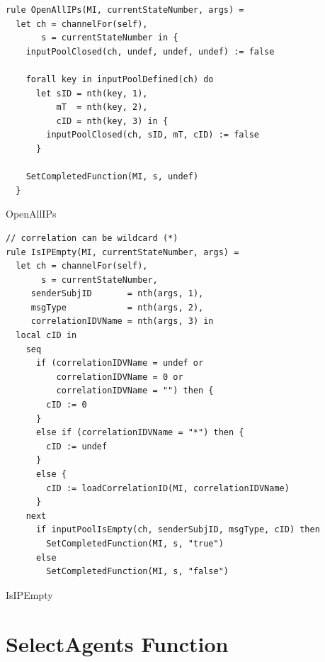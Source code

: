 \begin{listing}[H]
\begin{verbatim}
rule OpenAllIPs(MI, currentStateNumber, args) =
  let ch = channelFor(self),
       s = currentStateNumber in {
    inputPoolClosed(ch, undef, undef, undef) := false

    forall key in inputPoolDefined(ch) do
      let sID = nth(key, 1),
          mT  = nth(key, 2),
          cID = nth(key, 3) in {
        inputPoolClosed(ch, sID, mT, cID) := false
      }

    SetCompletedFunction(MI, s, undef)
  }
\end{verbatim}
\caption{OpenAllIPs}
\label{lst:asm:OpenAllIPs}
\end{listing}




\begin{listing}[H]
\begin{verbatim}
// correlation can be wildcard (*)
rule IsIPEmpty(MI, currentStateNumber, args) =
  let ch = channelFor(self),
       s = currentStateNumber,
     senderSubjID       = nth(args, 1),
     msgType            = nth(args, 2),
     correlationIDVName = nth(args, 3) in
  local cID in
    seq
      if (correlationIDVName = undef or
          correlationIDVName = 0 or
          correlationIDVName = "") then {
        cID := 0
      }
      else if (correlationIDVName = "*") then {
        cID := undef
      }
      else {
        cID := loadCorrelationID(MI, correlationIDVName)
      }
    next
      if inputPoolIsEmpty(ch, senderSubjID, msgType, cID) then
        SetCompletedFunction(MI, s, "true")
      else
        SetCompletedFunction(MI, s, "false")
\end{verbatim}
\caption{IsIPEmpty}
\label{lst:asm:IsIPEmpty}
\end{listing}


\section{SelectAgents Function}



